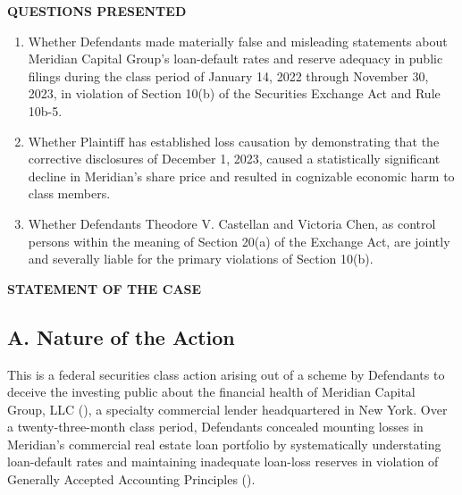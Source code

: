 \documentclass[12pt,letterpaper]{article}
\begin{document}
{}
\begin{center}
  {\large\bfseries\color{accent}QUESTIONS PRESENTED}
\end{center}

\begin{enumerate}[label=\textbf{\arabic*.},leftmargin=2em,itemsep=6pt,parsep=0pt]

\item Whether Defendants made materially false and misleading statements about
  Meridian Capital Group's loan-default rates and reserve adequacy in public
  filings during the class period of January 14, 2022 through November 30, 2023,
  in violation of Section 10(b) of the Securities Exchange Act and Rule 10b-5.

\item Whether Plaintiff has established loss causation by demonstrating that the
  corrective disclosures of December 1, 2023, caused a statistically significant
  decline in Meridian's share price and resulted in cognizable economic harm to
  class members.

\item Whether Defendants Theodore V. Castellan and Victoria Chen, as control
  persons within the meaning of Section 20(a) of the Exchange Act, are jointly
  and severally liable for the primary violations of Section 10(b).

\end{enumerate}

{}
\begin{center}
  {\large\bfseries\color{accent}STATEMENT OF THE CASE}
\end{center}

\subsection*{A. Nature of the Action}

This is a federal securities class action arising out of a scheme by Defendants to deceive the investing public about the financial health of Meridian Capital Group, LLC (), a specialty commercial lender headquartered in New York. Over a twenty-three-month class period, Defendants concealed mounting losses in Meridian's commercial real estate loan portfolio by systematically understating loan-default rates and maintaining inadequate loan-loss reserves in violation of Generally Accepted Accounting Principles ().
\end{document}
